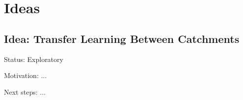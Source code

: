 \section{Ideas}

\subsection{Idea: Transfer Learning Between Catchments}

Status: Exploratory

Motivation:
...

Next steps:
...
